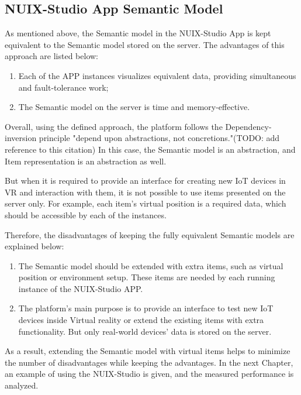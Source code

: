 \subsection{NUIX-Studio App Semantic Model}

As mentioned above, the Semantic model in the NUIX-Studio App is kept equivalent to the Semantic model stored on the server. The advantages of this approach are listed below:

\begin{enumerate}
    \item Each of the APP instances visualizes equivalent data, providing simultaneous and fault-tolerance work;
    \item The Semantic model on the server is time and memory-effective.
\end{enumerate}

Overall, using the defined approach, the platform follows the Dependency-inversion principle "depend upon abstractions, not concretions."(TODO: add reference to this citation) In this case, the Semantic model is an abstraction, and Item representation is an abstraction as well.

But when it is required to provide an interface for creating new IoT devices in VR and interaction with them, it is not possible to use items presented on the server only. For example, each item's virtual position is a required data, which should be accessible by each of the instances.

Therefore, the disadvantages of keeping the fully equivalent Semantic models are explained below:

\begin{enumerate}
    \item The Semantic model should be extended with extra items, such as virtual position or environment setup. These items are needed by each running instance of the NUIX-Studio APP.
    \item The platform's main purpose is to provide an interface to test new IoT devices inside Virtual reality or extend the existing items with extra functionality. But only real-world devices' data is stored on the server.
\end{enumerate}

As a result, extending the Semantic model with virtual items helps to minimize the number of disadvantages while keeping the advantages.
In the next Chapter, an example of using the NUIX-Studio is given, and the measured performance is analyzed.